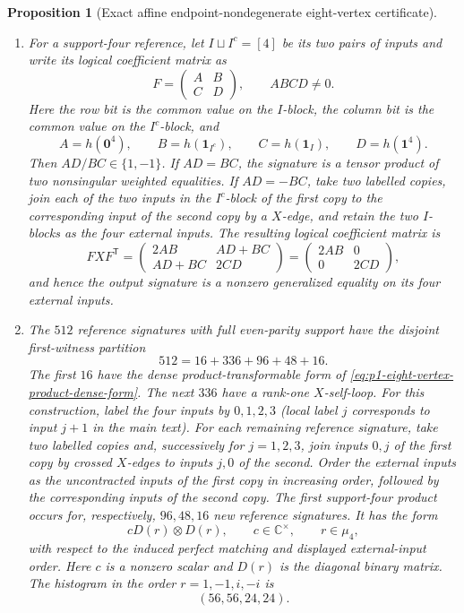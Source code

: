\documentclass[11pt,letterpaper,onecolumn]{article}
\theoremstyle{plain}
\newtheorem{proposition}[proposition]{Proposition}
\theoremstyle{definition}
\theoremstyle{remark}
\newcommand{\one}{\mathbf 1}
\newcommand{\zero}{\mathbf 0}
\begin{document}
\begin{proposition}[Exact affine endpoint-nondegenerate eight-vertex certificate]
\begin{enumerate}[label=\textnormal{(\roman*)}]
\item For a support-four reference, let \(I\sqcup I^c=[4]\) be its two
pairs of inputs and write its logical coefficient matrix as
\[
 F=\begin{pmatrix}A&B\\ C&D\end{pmatrix},
 \qquad ABCD\ne0.
\]
Here the row bit is the common value on the \(I\)-block, the column bit is
the common value on the \(I^c\)-block, and
\[
 A=h(\zero^4),\qquad B=h(\one_{I^c}),\qquad
 C=h(\one_I),\qquad D=h(\one^4).
\]
Then \(AD/BC\in\{1,-1\}\).  If \(AD=BC\), the signature is a tensor
product of two nonsingular weighted equalities.  If \(AD=-BC\), take two
labelled copies, join each of the two inputs in the \(I^c\)-block
of the first copy to the corresponding input of the second copy by a \(X\)-edge, and retain the two \(I\)-blocks as the four external inputs.
The resulting logical coefficient matrix is
\begin{equation}
 FXF^{\mathsf T}
 =\begin{pmatrix}
 2AB&AD+BC\\
 AD+BC&2CD
 \end{pmatrix}
 =\begin{pmatrix}2AB&0\\0&2CD\end{pmatrix},
 \label{eq:cert-affine-q4-support-four-gadget}
\end{equation}
and hence the output signature is a nonzero generalized equality on
its four external inputs.

\item The \(512\) reference signatures with full even-parity support have the disjoint first-witness
partition
\begin{equation}
  512=16+336+96+48+16.
  \label{eq:cert-affine-q4-full-partition}
\end{equation}
The first \(16\) have the dense product-transformable form of
\cref{eq:p1-eight-vertex-product-dense-form}.  The next \(336\) have a
rank-one \(X\)-self-loop.  For this construction, label the four inputs by \(0,1,2,3\)
(local label \(j\) corresponds to input \(j+1\) in the main text).
For each remaining reference signature, take two
labelled copies and, successively for \(j=1,2,3\), join inputs \(0,j\) of
the first copy by crossed \(X\)-edges to inputs \(j,0\) of the
second.  Order the external inputs as the uncontracted inputs of the first
copy in increasing order, followed by the corresponding inputs of the second
copy.  The first support-four product occurs for, respectively,
\(96,48,16\) new reference signatures.  It has the form
\[
  cD(r)\otimes D(r),
  \qquad c\in\mathbb C^\times,
  \qquad r\in\mu_4,
\]
with respect to the induced perfect matching and displayed external-input order.  Here \(c\) is a nonzero scalar and \(D(r)\) is the diagonal binary
matrix.  The histogram in the order \(r=1,-1,i,-i\) is
\[
  (56,56,24,24).
\]


\end{enumerate}
\end{proposition}
\end{document}
